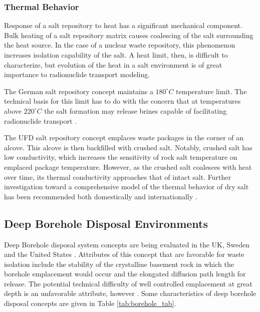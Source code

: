 \subsubsection{Thermal Behavior}
\label{subsec:saltthermal}

Response of a salt repository to heat has a significant
mechanical component. Bulk heating of a salt repository matrix causes
coalescing  of the salt surrounding the heat source. In the case of a nuclear
waste repository, this phenomenon increases isolation capability of the salt. A
heat limit, then, is difficult to characterize, but evolution of the heat in a
salt environment is of great importance to radionuclide transport modeling. 

The German salt repository concept maintains a $180^\circ C$ temperature limit. 
The technical basis for this limit has to do with the concern that at
temperatures above $220^\circ C$ the salt formation may release brines capable 
of facilitating radionuclide transport 
\cite{von_lensa_red-impact_2008, brewitz_long-term_2002}.

The \gls{UFD} salt repository concept emplaces waste packages in the corner of 
an alcove. This alcove is then backfilled with crushed salt. Notably, crushed 
salt has low conductivity, which increases the sensitivity of rock salt 
temperature on emplaced package temperature. However, as the crushed salt 
coalesces with heat over time, its thermal conductivity approaches that of 
intact salt. Further investigation toward a comprehensive model of the thermal 
behavior of dry salt has been recommended both domestically and internationally 
\cite{carter_disposal_2011}. 




\subsection{Deep Borehole Disposal Environments}

Deep Borehole disposal system concepts are being evaluated in the UK, 
Sweden and the United States \cite{von_lensa_red-impact_2008, 
clayton_generic_2011}. Attributes of this concept that are 
favorable for waste isolation include the stability of the crystalline 
basement rock in which the borehole emplacement would occur and the elongated
diffusion path length for release. The potential technical difficulty of well 
controlled emplacement at great depth is an unfavorable attribute, however 
\cite{hardin_generic_2011}.  Some characteristics of deep borehole disposal 
concepts are given in Table \ref{tab:borehole_tab}.   

